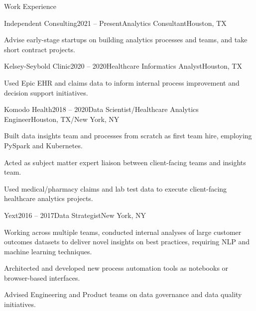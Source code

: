 \documentclass{resume} %
\begin{document}

\begin{rSection}{Work Experience}
	
\begin{rSubsection}{Independent Consulting}{2021 -- Present}{Analytics Consultant}{Houston, TX}
	\item Advise early-stage startups on building analytics processes and teams, and take short contract projects.
\end{rSubsection}

\begin{rSubsection}{Kelsey-Seybold Clinic}{2020 -- 2020}{Healthcare Informatics Analyst}{Houston, TX}
\item Used Epic EHR and claims data to inform internal process improvement and decision support initiatives.

\end{rSubsection}
\begin{rSubsection}{Komodo Health}{2018 -- 2020}{Data Scientist/Healthcare Analytics Engineer}{Houston, TX/New York, NY}
\item Built data insights team and processes from scratch as first team hire, employing PySpark and Kubernetes.
\item Acted as subject matter expert liaison between client-facing teams and insights team.
\item Used medical/pharmacy claims and lab test data to execute client-facing healthcare analytics projects.

\end{rSubsection}
\begin{rSubsection}{Yext}{2016 -- 2017}{Data Strategist}{New York, NY}
\item Working across multiple teams, conducted internal analyses of large customer outcomes datasets to deliver novel insights on best practices, requiring NLP and machine learning techniques.
\item Architected and developed new process automation tools as notebooks or browser-based interfaces.
\item Advised Engineering and Product teams on data governance and data quality initiatives.

\end{rSubsection}


\end{rSection}
\end{document}
